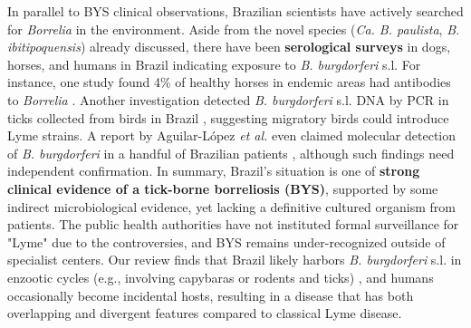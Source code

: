\documentclass[11pt,letterpaper]{article}
\begin{document}
In parallel to BYS clinical observations, Brazilian scientists have actively searched for \textit{Borrelia} in the environment. Aside from the novel species (\textit{Ca. B. paulista}, \textit{B. ibitipoquensis}) already discussed, there have been \textbf{serological surveys} in dogs, horses, and humans in Brazil indicating exposure to \textit{B. burgdorferi} s.l. For instance, one study found 4\% of healthy horses in endemic areas had antibodies to \textit{Borrelia} \citep{Jorge2023, Jorge2023a}. Another investigation detected \textit{B. burgdorferi} s.l. DNA by PCR in ticks collected from birds in Brazil \citep{Lucca2024n}, suggesting migratory birds could introduce Lyme strains. A report by Aguilar-López \textit{et al.} even claimed molecular detection of \textit{B. burgdorferi} in a handful of Brazilian patients \citep{Lucca2024o}, although such findings need independent confirmation. In summary, Brazil's situation is one of \textbf{strong clinical evidence of a tick-borne borreliosis (BYS)}, supported by some indirect microbiological evidence, yet lacking a definitive cultured organism from patients. The public health authorities have not instituted formal surveillance for "Lyme" due to the controversies, and BYS remains under-recognized outside of specialist centers. Our review finds that Brazil likely harbors \textit{B. burgdorferi} s.l. in enzootic cycles (e.g., involving capybaras or rodents and ticks) \citep{Jorge2023b}, and humans occasionally become incidental hosts, resulting in a disease that has both overlapping and divergent features compared to classical Lyme disease.
\end{document}
